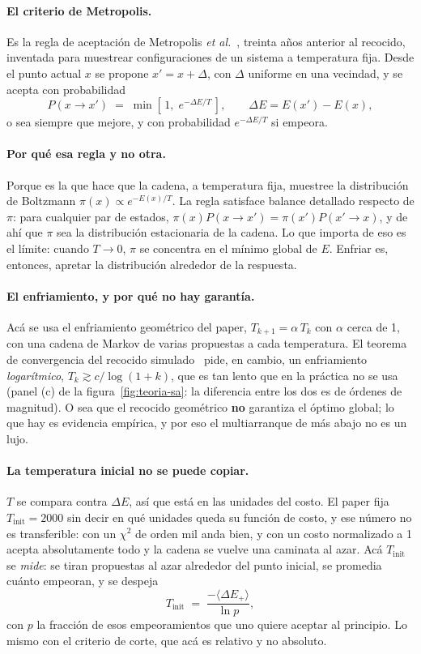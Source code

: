 \documentclass[11pt,a4paper]{article}
\begin{document}
\paragraph{El criterio de Metropolis.} Es la regla de aceptación de
Metropolis \emph{et al.}~\cite{metropolis1953}, treinta años anterior al
recocido, inventada para muestrear configuraciones de un sistema a
temperatura fija. Desde el punto actual $x$ se propone
$x' = x + \Delta$, con $\Delta$ uniforme en una vecindad, y se acepta con
probabilidad
\[
   P(x \to x') \;=\;
   \min\!\left[\,1,\; e^{-\Delta E / T}\,\right],
   \qquad \Delta E = E(x') - E(x),
\]
o sea siempre que mejore, y con probabilidad $e^{-\Delta E/T}$ si empeora.

\paragraph{Por qué esa regla y no otra.} Porque es la que hace que la cadena,
a temperatura fija, muestree la distribución de Boltzmann
$\pi(x) \propto e^{-E(x)/T}$. La regla satisface balance detallado respecto de
$\pi$: para cualquier par de estados, $\pi(x)P(x\to x') = \pi(x')P(x'\to x)$,
y de ahí que $\pi$ sea la distribución estacionaria de la cadena. Lo que
importa de eso es el límite: cuando $T \to 0$, $\pi$ se concentra en el mínimo
global de $E$. Enfriar es, entonces, apretar la distribución alrededor de la
respuesta.

\paragraph{El enfriamiento, y por qué no hay garantía.} Acá se usa el
enfriamiento geométrico del paper, $T_{k+1} = \alpha\,T_k$ con $\alpha$ cerca
de 1, con una cadena de Markov de varias propuestas a cada temperatura. El
teorema de convergencia del recocido simulado~\cite{geman1984} pide, en
cambio, un enfriamiento \emph{logarítmico}, $T_k \gtrsim c/\log(1+k)$, que es
tan lento que en la
práctica no se usa (panel (c) de la figura~\ref{fig:teoria-sa}: la diferencia
entre los dos es de órdenes de magnitud). O sea que el recocido geométrico
\textbf{no} garantiza el óptimo global; lo que hay es evidencia empírica, y por
eso el multiarranque de más abajo no es un lujo.

\paragraph{La temperatura inicial no se puede copiar.} $T$ se compara contra
$\Delta E$, así que está en las unidades del costo. El paper fija
$T_{\text{init}} = 2000$ sin decir en qué unidades queda su función de costo,
y ese número no es transferible: con un $\chi^2$ de orden mil anda bien, y con
un costo normalizado a 1 acepta absolutamente todo y la cadena se vuelve una
caminata al azar. Acá $T_{\text{init}}$ se \emph{mide}: se tiran propuestas al
azar alrededor del punto inicial, se promedia cuánto empeoran, y se despeja
\[
   T_{\text{init}} \;=\; \frac{-\langle \Delta E_+ \rangle}{\ln p},
\]
con $p$ la fracción de esos empeoramientos que uno quiere aceptar al principio.
Lo mismo con el criterio de corte, que acá es relativo y no absoluto.
\end{document}
